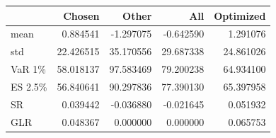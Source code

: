 \begin{tabular}{lrrrr}
\toprule
 & Chosen & Other & All & Optimized \\
\midrule
mean & 0.884541 & -1.297075 & -0.642590 & 1.291076 \\
std & 22.426515 & 35.170556 & 29.687338 & 24.861026 \\
VaR 1\% & 58.018137 & 97.583469 & 79.200238 & 64.934100 \\
ES 2.5\% & 56.840641 & 90.297836 & 77.390130 & 65.397958 \\
SR & 0.039442 & -0.036880 & -0.021645 & 0.051932 \\
GLR & 0.048367 & 0.000000 & 0.000000 & 0.065753 \\
\bottomrule
\end{tabular}
